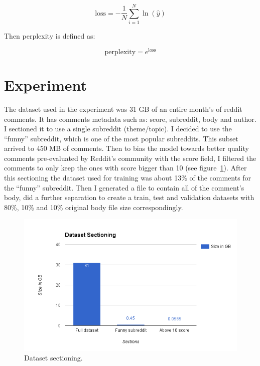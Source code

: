 \documentclass{article} %
\begin{document}
\begin{equation}
\textrm{loss} = -\frac{1}{N}\sum_{i=1}^{N} \ln{(\hat{y})}
\end{equation}

Then perplexity is defined as:

\begin{equation}
\textrm{perplexity} = e^{\textrm{loss}}
\end{equation}


\section{Experiment}
The dataset used in the experiment was 31 GB of an entire month's of reddit
comments. It has comments metadata such as: score, subreddit, body and author.
I sectioned it to use a single subreddit (theme/topic). I decided to use the
``funny'' subreddit, which is one of the most popular subreddits. This subset
arrived to 450 MB of comments. Then to bias the model towards better quality
comments pre-evaluated by Reddit's community with the score field, I filtered
the comments to only keep the ones with score bigger than 10 (see
figure~\ref{fig:datasetsection}).  After this sectioning the dataset used for
training was about 13\% of the comments for the ``funny'' subreddit. Then I
generated a file to contain all of the comment's body, did a further separation
to create a train, test and validation datasets with 80\%, 10\% and 10\%
original body file size correspondingly.

\begin{figure}[h]
\centering
\includegraphics[scale=0.5]{dataset_sectioning}
\caption{Dataset sectioning.}
\label{fig:datasetsection}
\end{figure}
\end{document}
